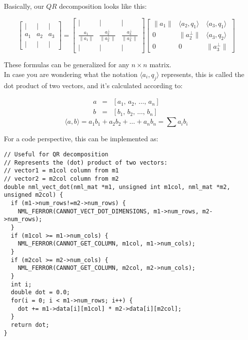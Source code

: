 Basically, our $QR$ decomposition looks like this:

$$
\begin{bmatrix}
| & | & | \\
a_{1} & a_{2} & a_{3} \\
| & | & |
\end{bmatrix}
=
\begin{bmatrix}
| & | & | \\
\frac{a_{1}}{\lVert a_{1} \rVert} & \frac{a^{\bot}_{2}}{\lVert a^{\bot}_{2} \rVert} & \frac{a^{\bot}_{3}}{\lVert a^{\bot}_{3} \rVert} \\
| & | & |
\end{bmatrix}
\begin{bmatrix}
\lVert a_{1} \rVert &  \langle a_{2}, q_{1} \rangle & \langle a_{3}, q_{1} \rangle \\
0 & \lVert a^{\bot}_{2} \rVert &  \langle a_{3}, q_{2} \rangle \\
0 & 0 & \lVert a^{\bot}_{3} \rVert
\end{bmatrix}
$$

These formulas can be generalized for any $n\times n$ matrix.
\\

In case you are wondering what the notation $\langle a_i, q_j\rangle$ represents, this is called the dot product of two vectors, and it's calculated according to:

\begin{eqnarray}
\nonumber a & = & [a_1,\, a_2,\, \ldots,\, a_n] \\
\nonumber b & = & [b_1,\, b_2,\, \ldots,\, b_n]
\end{eqnarray}
$$
\langle a, b\rangle = a_1b_1 + a_2b_2 + \ldots + a_nb_n = \sum a_i b_i
$$

For a code perspective, this can be implemented as:

\begin{verbatim}
// Useful for QR decomposition
// Represents the (dot) product of two vectors:
// vector1 = m1col column from m1
// vector2 = m2col column from m2
double nml_vect_dot(nml_mat *m1, unsigned int m1col, nml_mat *m2, unsigned m2col) {
  if (m1->num_rows!=m2->num_rows) {
    NML_FERROR(CANNOT_VECT_DOT_DIMENSIONS, m1->num_rows, m2->num_rows);
  }
  if (m1col >= m1->num_cols) {
    NML_FERROR(CANNOT_GET_COLUMN, m1col, m1->num_cols);
  }
  if (m2col >= m2->num_cols) {
    NML_FERROR(CANNOT_GET_COLUMN, m2col, m2->num_cols);
  }
  int i;
  double dot = 0.0;
  for(i = 0; i < m1->num_rows; i++) {
    dot += m1->data[i][m1col] * m2->data[i][m2col];
  }
  return dot;
} 
\end{verbatim}

